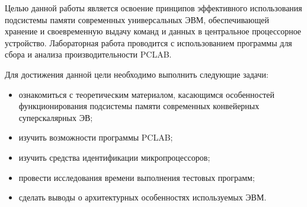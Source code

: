 
	Целью данной работы является освоение принципов эффективного использования подсистемы памяти современных универсальных ЭВМ, обеспечивающей хранение и своевременную выдачу команд и данных в центральное процессорное устройство.
	Лабораторная работа проводится с использованием программы для сбора и анализа производительности PCLAB.

Для достижения данной цели необходимо выполнить следующие задачи:
\begin{itemize}
	\item ознакомиться с теоретическим материалом, касающимся особенностей функционирования подсистемы памяти современных конвейерных суперскалярных ЭВ;
	\item изучить возможности программы PCLAB;
	\item изучить средства идентификации микропроцессоров;
	\item провести исследования времени выполнения тестовых программ;
	\item сделать выводы о архитектурных особенностях используемых ЭВМ.
\end{itemize}
